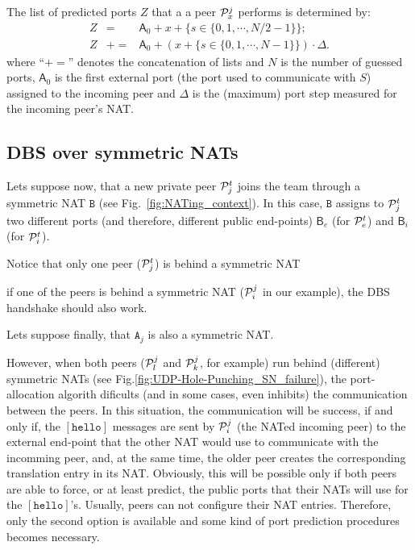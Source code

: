 The list of predicted ports $Z$ that a a peer ${\cal P}^j_x$ performs
is determined by:
\begin{equation}
  \begin{array}{rcl}
    Z & = & \textsf{A}_0 + x + \{s\in\{0,1,\cdots,N/2-1\}\}; \\
    Z & += & \textsf{A}_0 + (x + \{s\in\{0,1,\cdots, N-1\}\}) \cdot \Delta.
  \end{array}
\end{equation}
where ``$+=$'' denotes the concatenation of lists and $N$ is the
number of guessed ports, $\textsf{A}_0$ is the first external port (the
port used to communicate with $S$) assigned to the incoming peer and
$\Delta$ is the (maximum) port step measured for the incoming peer's
NAT.






\subsection{DBS over symmetric NATs}


Lets suppose now, that a new private peer ${\cal P}^t_j$ joins the
team through a symmetric NAT $\mathtt{B}$ (see
Fig.~\ref{fig:NATing_context}). In this case, $\mathtt{B}$ assigns
to ${\cal P}^t_j$ two different ports (and therefore, different
public end-points) $\mathsf{B}_e$ (for ${\cal P}^t_e$) and
$\mathsf{B}_i$ (for ${\cal P}^t_i$).

Notice that only one peer (${\cal P}^t_j$) is behind a symmetric NAT

if one of the peers is
behind a symmetric NAT (${\cal P}^j_i$ in our example), the DBS
handshake should also work.

Lets suppose finally, that $\mathtt{A}_j$ is also a symmetric NAT.

 However, when both peers (${\cal P}^j_l$ and
${\cal P}^j_k$, for example) run behind (different) symmetric NATs
(see Fig.\ref{fig:UDP-Hole-Punching_SN_failure}), the port-allocation
algorith dificults (and in some cases, even inhibits) the
communication between the peers. In this situation, the communication
will be success, if and only if, the $[\mathtt{hello}]$ messages are
sent by ${\cal P}^j_i$ (the NATed incoming peer) to the external
end-point that the other NAT would use to communicate with the
incomming peer, and, at the same time, the older peer creates the
corresponding translation entry in its NAT. Obviously, this will be
possible only if both peers are able to force, or at least predict,
the public ports that their NATs will use for the
$[\mathtt{hello}]$'s. Usually, peers can not configure their NAT
entries. Therefore, only the second option is available and some kind
of port prediction procedures becomes necessary.

